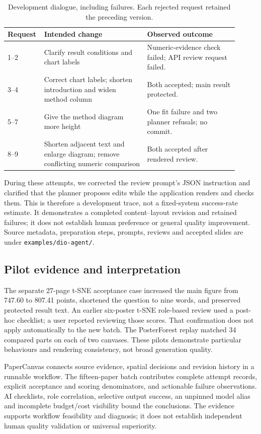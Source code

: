\documentclass{article}
\begin{document}
\begin{table}[htbp]
\centering\small
\caption{Development dialogue, including failures. Each rejected request retained the preceding version.}
\label{tab:showcase}
\begin{tabular}{p{0.10\linewidth}p{0.43\linewidth}p{0.38\linewidth}}
\toprule
Request & Intended change & Observed outcome \\
\midrule
1--2 & Clarify result conditions and chart labels & Numeric-evidence check failed; API review request failed. \\
3--4 & Correct chart labels; shorten introduction and widen method column & Both accepted; main result protected. \\
5--7 & Give the method diagram more height & One fit failure and two planner refusals; no commit. \\
8--9 & Shorten adjacent text and enlarge diagram; remove conflicting numeric comparison & Both accepted after rendered review. \\
\bottomrule
\end{tabular}
\end{table}

During these attempts, we corrected the review prompt's JSON instruction and clarified that the planner proposes edits while the application renders and checks them. This is therefore a development trace, not a fixed-system success-rate estimate. It demonstrates a completed content--layout revision and retained failures; it does not establish human preference or general quality improvement. Source metadata, preparation steps, prompts, reviews and accepted slides are under \texttt{examples/dio-agent/}.

\subsection{Pilot evidence and interpretation}
The separate 27-page t-SNE acceptance case increased the main figure from 747.60 to 807.41 points, shortened the question to nine words, and preserved protected result text. An earlier six-poster t-SNE role-based review used a post-hoc checklist; a user reported reviewing those scores. That confirmation does not apply automatically to the new batch. The PosterForest replay matched 34 compared parts on each of two canvases. These pilots demonstrate particular behaviours and rendering consistency, not broad generation quality.

PaperCanvas connects source evidence, spatial decisions and revision history in a runnable workflow. The fifteen-paper batch contributes complete attempt records, explicit acceptance and scoring denominators, and actionable failure observations. AI checklists, role correlation, selective output success, an unpinned model alias and incomplete budget/cost visibility bound the conclusions. The evidence supports workflow feasibility and diagnosis; it does not establish independent human quality validation or universal superiority.
\end{document}
